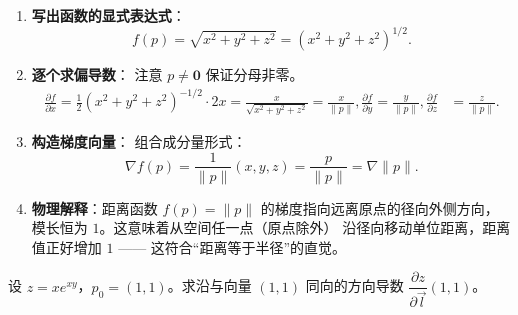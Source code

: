 \documentclass[lang=cn,11pt]{elegantbook}
\begin{document}
\begin{solution}
\begin{enumerate}
  \item \textbf{写出函数的显式表达式}：
  \[
  f(p)=\sqrt{x^2+y^2+z^2}=(x^2+y^2+z^2)^{1/2}.
  \]

  \item \textbf{逐个求偏导数}：
  注意 $p\neq\boldsymbol 0$ 保证分母非零。
  \begin{align*}
  \frac{\partial f}{\partial x} = \frac{1}{2}(x^2+y^2+z^2)^{-1/2}\cdot 2x = \frac{x}{\sqrt{x^2+y^2+z^2}} = \frac{x}{\|p\|}, \frac{\partial f}{\partial y} = \frac{y}{\|p\|}, \frac{\partial f}{\partial z} &= \frac{z}{\|p\|}.
  \end{align*}

  \item \textbf{构造梯度向量}：
  组合成分量形式：
  \[
  \boxed{
  \nabla f(p)=\frac{1}{\|p\|}(x,y,z)=\frac{p}{\|p\|}
         =\nabla\|p\| }.
  \]

  \item \textbf{物理解释}：距离函数 $f(p)=\|p\|$ 的梯度指向远离原点的径向外侧方向，
  模长恒为 $1$。这意味着从空间任一点（原点除外）
  沿径向移动单位距离，距离值正好增加 $1$ —— 这符合“距离等于半径”的直觉。
\end{enumerate}
\end{solution}

\begin{exercise}[沿特定方向的方向导数] \label{ex:grad-exp}
设 $z=xe^{xy}$，$p_0=(1,1)$。求沿与向量 $(1,1)$ 同向的方向导数 $\dfrac{\partial z}{\partial\vec l}(1,1)$。
\end{exercise}
\end{document}

